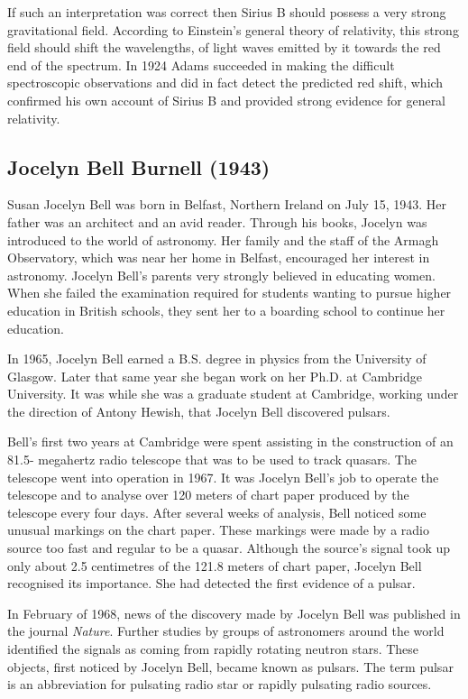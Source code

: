 If such an interpretation was correct then Sirius B should possess a very strong gravitational field. According to Einstein's general theory of relativity, this strong field should shift the wavelengths, of light waves emitted by it towards the red end of the spectrum. In 1924 Adams succeeded in making the difficult spectroscopic observations and did in fact detect the predicted red shift, which confirmed his own account of Sirius B and provided strong evidence for general relativity.

\subsection[Jocelyn \scshape{Bell Burnell}]{Jocelyn Bell Burnell (1943)}\label{bio:bell-burnell}
Susan Jocelyn Bell was born in Belfast, Northern Ireland on July 15, 1943. Her father was an architect and an avid reader. Through his books, Jocelyn was introduced to the world of astronomy. Her family and the staff of the Armagh Observatory, which was near her home in Belfast, encouraged her interest in astronomy. Jocelyn Bell's parents very strongly believed in educating women. When she failed the examination required for students wanting to pursue higher education in British schools, they sent her to a boarding school to continue her education.

In 1965, Jocelyn Bell earned a B.S. degree in physics from the University of Glasgow. Later that same year she began work on her Ph.D. at Cambridge University. It was while she was a graduate student at Cambridge, working under the direction of Antony Hewish, that Jocelyn Bell discovered pulsars.

Bell's first two years at Cambridge were spent assisting in the construction of an 81.5- megahertz radio telescope that was to be used to track quasars. The telescope went into operation in 1967. It was Jocelyn Bell's job to operate the telescope and to analyse over 120 meters of chart paper produced by the telescope every four days. After several weeks of analysis, Bell noticed some unusual markings on the chart paper. These markings were made by a radio source too fast and regular to be a quasar. Although the source's signal took up only about 2.5 centimetres of the 121.8 meters of chart paper, Jocelyn Bell recognised its importance. She had detected the first evidence of a pulsar.

In February of 1968, news of the discovery made by Jocelyn Bell was published in the journal \textit{Nature}. Further studies by groups of astronomers around the world identified the signals as coming from rapidly rotating neutron stars. These objects, first noticed by Jocelyn Bell, became known as pulsars. The term pulsar is an abbreviation for pulsating radio star or rapidly pulsating radio sources.

